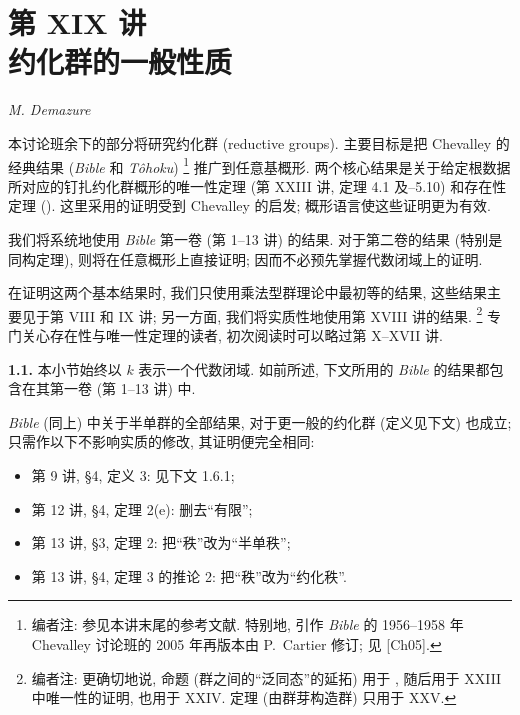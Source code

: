 \chapter*{第 XIX 讲\\[0.4em]约化群的一般性质}
\begin{center}
\textit{M. Demazure}
\end{center}
\begingroup
\renewcommand{\thefootnote}{0}%
%
\endgroup

本讨论班余下的部分将研究约化群 (reductive groups). 主要目标是把 Chevalley 的经典结果 (\emph{Bible} 和 \emph{Tôhoku})%
\footnote{编者注: 参见本讲末尾的参考文献. 特别地, 引作 \emph{Bible} 的 1956--1958 年 Chevalley 讨论班的 2005 年再版本由 P.\ Cartier 修订; 见 [Ch05].}
推广到任意基概形. 两个核心结果是关于给定根数据所对应的钉扎约化群概形的唯一性定理 (第 XXIII 讲, 定理 4.1 及--5.10) 和存在性定理 (). 这里采用的证明受到 Chevalley 的启发; 概形语言使这些证明更为有效.

我们将系统地使用 \emph{Bible} 第一卷 (第 1--13 讲) 的结果. 对于第二卷的结果 (特别是同构定理), 则将在任意概形上直接证明; 因而不必预先掌握代数闭域上的证明.

在证明这两个基本结果时, 我们只使用乘法型群理论中最初等的结果, 这些结果主要见于第 VIII 和 IX 讲; 另一方面, 我们将实质性地使用第 XVIII 讲的结果.%
\footnote{编者注: 更确切地说, 命题  (群之间的“泛同态”的延拓) 用于 , 随后用于 XXIII 中唯一性的证明, 也用于 XXIV. 定理  (由群芽构造群) 只用于 XXV.}
专门关心存在性与唯一性定理的读者, 初次阅读时可以略过第 X--XVII 讲.

\noindent{}\textbf{1.1.}\quad
本小节始终以 \(k\) 表示一个代数闭域. 如前所述, 下文所用的 \emph{Bible} 的结果都包含在其第一卷 (第 1--13 讲) 中.

\emph{Bible} (同上) 中关于半单群的全部结果, 对于更一般的约化群 (定义见下文) 也成立; 只需作以下不影响实质的修改, 其证明便完全相同:
\begin{itemize}
\item 第 9 讲, §4, 定义 3: 见下文 1.6.1;
\item 第 12 讲, §4, 定理 2(e): 删去“有限”;
\item 第 13 讲, §3, 定理 2: 把“秩”改为“半单秩”;
\item 第 13 讲, §4, 定理 3 的推论 2: 把“秩”改为“约化秩”.
\end{itemize}


